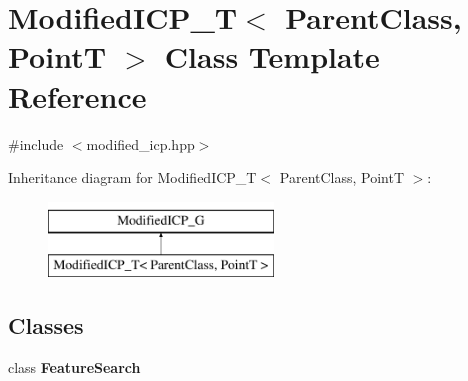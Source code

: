 \hypertarget{classModifiedICP__T}{
\section{ModifiedICP\_\-T$<$ ParentClass, PointT $>$ Class Template Reference}
\label{classModifiedICP__T}
}


{\ttfamily \#include $<$modified\_\-icp.hpp$>$}

Inheritance diagram for ModifiedICP\_\-T$<$ ParentClass, PointT $>$:\begin{figure}[H]
\begin{center}
\leavevmode
\includegraphics[height=2.000000cm]{classModifiedICP__T}
\end{center}
\end{figure}
\subsection*{Classes}
\begin{DoxyCompactItemize}
\item 
class {\bfseries FeatureSearch}
\end{DoxyCompactItemize}
